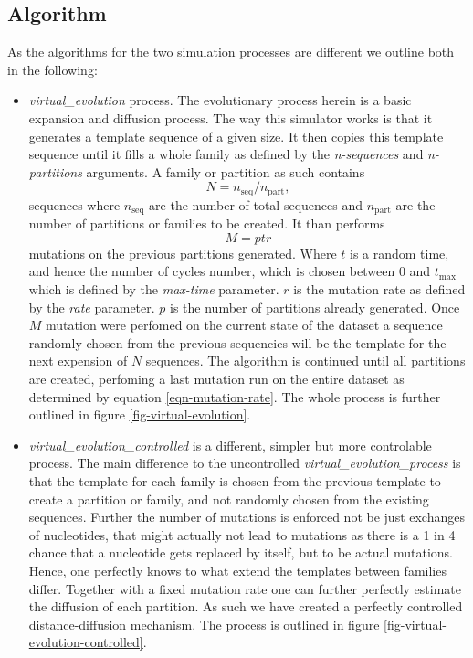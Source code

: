 \subsection{Algorithm}
As the algorithms for the two simulation processes are different we
outline both in the following:
\begin{itemize}
  \item \emph{virtual\_evolution} process. The evolutionary process
    herein is a basic expansion and diffusion process. The way this
    simulator works is that it generates a template sequence of a
    given size. It then copies this template sequence until it fills a whole
    family as defined by the \emph{n-sequences} and
    \emph{n-partitions} arguments. A family or partition as such
    contains
    \begin{equation}
      N = n_{\mathrm{seq}}/n_{\mathrm{part}},
    \end{equation} sequences where
    $n_{\mathrm{seq}}$ are the number of total sequences and
    $n_{\mathrm{part}}$ are the number of partitions or families to be
    created. It than performs
    \begin{equation}
      M = ptr \label{eqn-mutation-rate}
    \end{equation}
    mutations on the previous partitions generated. Where $t$ is a random
    time, and hence the number of cycles number, which is chosen between 0
    and $t_{\mathrm{max}}$ which is defined by the \emph{max-time}
    parameter. $r$ is the mutation rate as defined by the \emph{rate}
    parameter. $p$ is the number of partitions already generated.
    Once $M$ mutation were perfomed on the current state of the
    dataset a sequence randomly chosen from the previous
    sequencies will be the template for the next expension of $N$
    sequences. The algorithm is continued until all partitions are
    created, perfoming a last mutation run on the entire dataset as
    determined by equation \ref{eqn-mutation-rate}.
    The whole process is further outlined in figure
    \ref{fig-virtual-evolution}.
  \item \emph{virtual\_evolution\_controlled} is a different, simpler
    but more controlable process. The main difference to the
    uncontrolled \emph{virtual\_evolution\_process} is that the
    template for each family is chosen from the previous template to
    create a partition or family, and not randomly chosen from the
    existing sequences. Further the number of mutations is enforced
    not be just exchanges of nucleotides, that might actually not lead
    to mutations as there is a 1 in 4 chance that a nucleotide gets
    replaced by itself, but to be actual mutations. Hence, one
    perfectly knows to what extend the templates between families
    differ. Together with a
    fixed mutation rate one can further perfectly estimate the diffusion of
    each partition. As such we have created a perfectly controlled
    distance-diffusion mechanism. The process is outlined in figure
    \ref{fig-virtual-evolution-controlled}.
\end{itemize}
